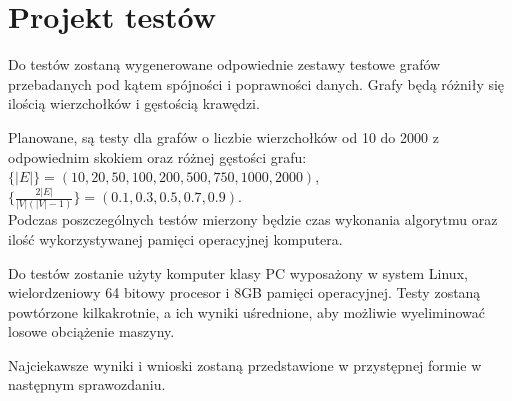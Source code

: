 \documentclass[a4paper, 10pt]{article}
\begin{document}
\section{Projekt testów}

Do testów zostaną wygenerowane odpowiednie zestawy testowe grafów przebadanych 
pod kątem spójności i poprawności danych. Grafy będą różniły się ilością wierzchołków i gęstością krawędzi.

Planowane, są testy dla grafów o liczbie wierzchołków od 10 do 2000 z odpowiednim skokiem oraz różnej gęstości grafu:\\
$\{|E|\}=(10, 20, 50, 100, 200, 500, 750, 1000,2000)$, \\ $\{\frac{2|E|}{|V|(|V|-1)}\}= (0.1,0.3,0.5,0.7,0.9)$. \\
Podczas poszczególnych testów mierzony będzie czas wykonania algorytmu oraz ilość wykorzystywanej pamięci operacyjnej komputera.

Do testów zostanie użyty komputer klasy PC wyposażony w system Linux, wielordzeniowy 64 bitowy procesor i 8GB pamięci operacyjnej. Testy zostaną powtórzone kilkakrotnie, a ich wyniki uśrednione, 
aby możliwie wyeliminować losowe obciążenie maszyny.

Najciekawsze wyniki i wnioski zostaną przedstawione w przystępnej formie w następnym sprawozdaniu.




	





\nocite{*}

\end{document}
